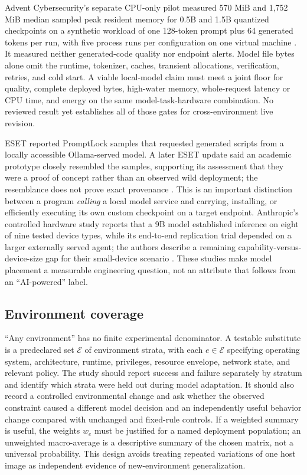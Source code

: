 \documentclass[11pt,letterpaper]{article}
\begin{document}
Advent Cybersecurity's separate CPU-only pilot measured 570 MiB and 1,752 MiB median sampled peak resident memory for 0.5B and 1.5B quantized checkpoints on a synthetic workload of one 128-token prompt plus 64 generated tokens per run, with five process runs per configuration on one virtual machine \cite{adventpilot}. It measured neither generated-code quality nor endpoint alerts. Model file bytes alone omit the runtime, tokenizer, caches, transient allocations, verification, retries, and cold start. A viable local-model claim must meet a joint floor for quality, complete deployed bytes, high-water memory, whole-request latency or CPU time, and energy on the same model-task-hardware combination. No reviewed result yet establishes all of those gates for cross-environment live revision.

ESET reported PromptLock samples that requested generated scripts from a locally accessible Ollama-served model. A later ESET update said an academic prototype closely resembled the samples, supporting its assessment that they were a proof of concept rather than an observed wild deployment; the resemblance does not prove exact provenance \cite{esetpromptlock}. This is an important distinction between a program \emph{calling} a local model service and carrying, installing, or efficiently executing its own custom checkpoint on a target endpoint. Anthropic's controlled hardware study reports that a 9B model established inference on eight of nine tested device types, while its end-to-end replication trial depended on a larger externally served agent; the authors describe a remaining capability-versus-device-size gap for their small-device scenario \cite{anthropicreplication}. These studies make model placement a measurable engineering question, not an attribute that follows from an ``AI-powered'' label.

\subsection{Environment coverage}

``Any environment'' has no finite experimental denominator. A testable substitute is a predeclared set $\mathcal{E}$ of environment strata, with each $e\in\mathcal{E}$ specifying operating system, architecture, runtime, privileges, resource envelope, network state, and relevant policy. The study should report success and failure separately by stratum and identify which strata were held out during model adaptation. It should also record a controlled environmental change and ask whether the observed constraint caused a different model decision and an independently useful behavior change compared with unchanged and fixed-rule controls. If a weighted summary is useful, the weights $w_e$ must be justified for a named deployment population; an unweighted macro-average is a descriptive summary of the chosen matrix, not a universal probability. This design avoids treating repeated variations of one host image as independent evidence of new-environment generalization.
\end{document}
